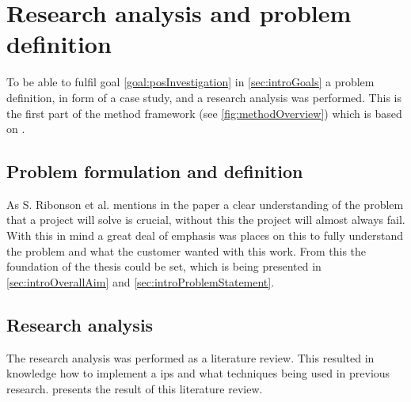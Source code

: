 \section{Research analysis and problem definition}\label{sec:methodProblemDefinition}
To be able to fulfil goal \ref{goal:posInvestigation} in \cref{sec:introGoals} a problem definition, in form of a case study, and a research analysis was performed.
This is the first part of the method framework (see \cref{fig:methodOverview}) which is based on \cite{SecretsSuccessfulSimulation1995}.


\subsection{Problem formulation and definition}\label{sec:}
As S. Ribonson et al. mentions in the paper \cite{SecretsSuccessfulSimulation1995} a clear understanding of the problem that a project will solve is crucial, without this the project will almost always fail.
With this in mind a great deal of emphasis was places on this to fully understand the problem and what the customer wanted with this work.
From this the foundation of the thesis could be set, which is being presented in \cref{sec:introOverallAim} and \ref{sec:introProblemStatement}.


\subsection{Research analysis}\label{sec:}
The research analysis was performed as a literature review. 
This resulted in knowledge how to implement a \acrfull{ips} and what techniques being used in previous research.
 presents the result of this literature review.


